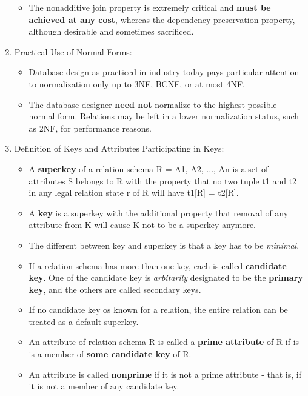 \documentclass[10pt]{article}
\newcommand{\tf}{\textbf}
\newcommand{\ti}{\textit}
\begin{document}
\begin{enumerate}
\begin{itemize}
		\item The nonadditive join property is extremely critical and \tf{must be achieved at any cost}, whereas the dependency preservation property, although desirable and sometimes sacrificed. 
	\end{itemize}

	\item Practical Use of Normal Forms:
	
	\begin{itemize}
		\item Database design as practiced in industry today pays particular attention to normalization only up to 3NF, BCNF, or at most 4NF.
		\item The database designer \tf{need not} normalize to the highest possible normal form. Relations may be left in a lower normalization status, such as 2NF, for performance reasons.
	\end{itemize}

	\item Definition of Keys and Attributes Participating in Keys:
	
	\begin{itemize}
		\item A \tf{superkey} of a relation schema R = {A1, A2, ..., An} is a set of attributes S belongs to R with the property that no two tuple t1 and t2 in any legal relation state r of R will have t1[R] = t2[R].
		\item A \tf{key} is a superkey with the additional property that removal of any attribute from K will cause K not to be a superkey anymore.
		\item The different between key and superkey is that a key has to be \ti{minimal}.
		\item If a relation schema has more than one key, each is called \tf{candidate key}. One of the candidate key is \ti{arbitarily} designated to be the \tf{primary key}, and the others are called secondary keys.
		\item If no candidate key os known for a relation, the entire relation can be treated as a default superkey.
		\item An attribute of relation schema R is called a \tf{prime attribute} of R if is is a member of \tf{some candidate key} of R.
		\item An attribute is called \tf{nonprime} if it is not a prime attribute - that is, if it is not a member of any candidate key.
	\end{itemize}
\end{enumerate}
\end{document}
